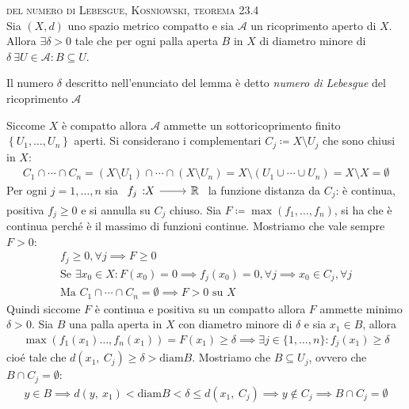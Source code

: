 \begin{lemming} \textsc{del numero di Lebesgue, Kosniowski, teorema 23.4} \label{teo numero lebesgue}\\
	Sia $\left(X, d\right)$ uno spazio metrico compatto e sia $\mathcal{A}$ un ricoprimento aperto di $X$. Allora $\exists \delta >0$ tale che per ogni palla aperta $B$ in $X$ di diametro minore di $\delta \ \exists U\in\mathcal{A} \colon B\subseteq U$.	
\end{lemming}
\begin{define}
	Il numero $\delta$ descritto nell'enunciato del lemma è detto \textit{numero di Lebesgue}  del ricoprimento $\mathcal{A}$
\end{define}
\begin{demonstration}
	Siccome $X$ è compatto allora $\mathcal{A}$ ammette un sottoricoprimento finito $\left\{ U_1,\dots,U_n \right\}$ aperti. Si considerano i complementari $C_j\coloneqq X\setminus U_j$ che sono chiusi in $X$:
		\begin{gather*}
			 C_1\cap\cdots\cap C_n=(X\setminus U_1)\cap \cdots\cap(X\setminus U_n)=X\setminus(U_1\cup\cdots\cup U_n)=X\setminus X=\emptyset
		\end{gather*}	
	Per ogni $j=1,\dots,n$ sia $\funz {f_j} X \realset$ la funzione distanza da $C_j$: è continua, positiva $f_j\geq 0$ e si annulla su $C_j$ chiuso. Sia $F\coloneqq \max(f_1,\dots,f_n)$, si ha che è continua perché è il massimo di funzioni continue. Mostriamo che vale sempre $F>0$:
		\begin{gather*}
			f_j\geq 0, \forall j \implies F\geq 0 \\
			\text{Se } \exists x_0\in X \colon F(x_0)=0 \implies f_j(x_0)=0, \forall j \implies x_0\in C_j, \forall j\\
			\text{Ma } C_1\cap\cdots\cap C_n=\emptyset \implies F>0 \text{ su } X
		\end{gather*}
	Quindi siccome $F$ è continua e positiva su un compatto allora $F$ ammette minimo $\delta>0$.\newline
	Sia $B$ una palla aperta in $X$ con diametro minore di $\delta$ e sia $x_1\in B$, allora 
		\begin{gather*}
			\max\left( f_1(x_1)\dots,f_n(x_1) \right)=F(x_1)\geq \delta \implies \exists j\in\{1,\dots,n\}\colon f_j(x_1)\geq \delta 
		\end{gather*}
	cioé tale che $d(x_1,\ C_j)\geq \delta > \text{diam}B$. Mostriamo che $B\subseteq U_j$, ovvero che $B\cap C_j=\emptyset$:
		\begin{gather*}
			y\in B \implies d(y,\ x_1)< \text{diam}B<\delta \leq d(x_1,\ C_j) \implies y\notin C_j \implies B\cap C_j=\emptyset 
		\end{gather*}
\end{demonstration}

